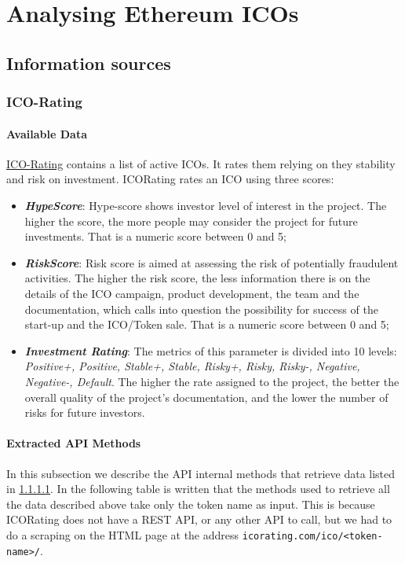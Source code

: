 \label{Chapter5}

\chapter{Analysing Ethereum ICOs}

\section{Information sources}
\label{informationsources}
\subsection{ICO-Rating}
\label{icoRating}
\subsubsection{Available Data}
\label{icoRatingAvailableData}
\href{https://icorating.com/}{ICO-Rating} contains a list of active ICOs. It rates them relying on they stability and risk on investment. ICORating rates an ICO using three scores:
\begin{itemize}
    \item \textit{\textbf{HypeScore}}: Hype-score shows investor level of interest in the project. The higher the score, the more people may consider the project for future investments. That is a numeric score between 0 and 5;
    \item \textit{\textbf{RiskScore}}: Risk score is aimed at assessing the risk of potentially fraudulent activities. The higher the risk score, the less information there is on the details of the ICO campaign, product development, the team and the documentation, which calls into question the possibility for success of the start-up and the ICO/Token sale. That is a numeric score between 0 and 5;
    \item \textit{\textbf{Investment Rating}}: The metrics of this parameter is divided into 10 levels: \textit{Positive+, Positive, Stable+, Stable, Risky+, Risky, Risky-, Negative, Negative-, Default}. The higher the rate assigned to the project, the better the overall quality of the project’s documentation, and the lower the number of risks for future investors.
\end{itemize}
\subsubsection{Extracted API Methods}
In this subsection we describe the API internal methods that retrieve data listed in \ref{icoRatingAvailableData}. \newline 
In the following table is written that the methods used to retrieve all the data described above take only the token name as input. \newline
This is because ICORating does not have a REST API, or any other API to call, but we had to do a scraping on the HTML page at the address \texttt{icorating.com/ico/<token-name>/}. \newline

